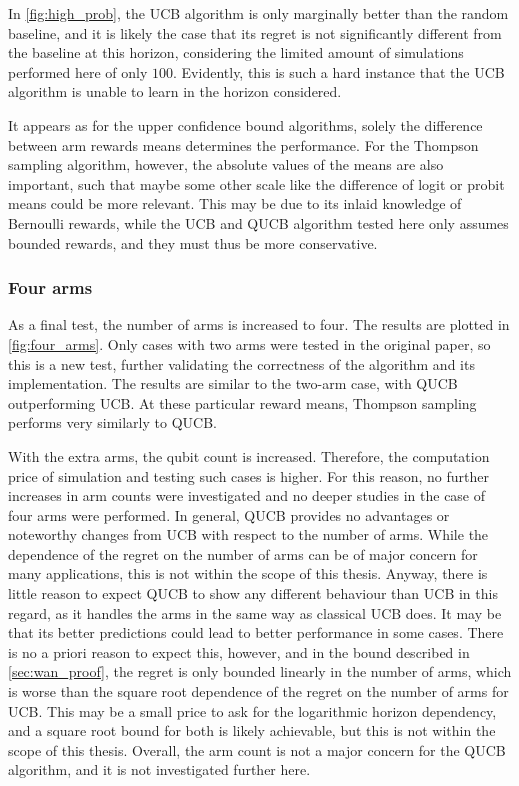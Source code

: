 In \cref{fig:high_prob}, the UCB algorithm is only marginally better than the random baseline, and it is likely the case that its regret is not significantly different from the baseline at this horizon, considering the limited amount of simulations performed here of only $100$.
Evidently, this is such a hard instance that the UCB algorithm is unable to learn in the horizon considered.

It appears as for the upper confidence bound algorithms, solely the difference between arm rewards means determines the performance.
For the Thompson sampling algorithm, however, the absolute values of the means are also important, such that maybe some other scale like the difference of logit or probit means could be more relevant.
This may be due to its inlaid knowledge of Bernoulli rewards, while the UCB and QUCB algorithm tested here only assumes bounded rewards, and they must thus be more conservative.

\clearpage

\subsubsection{Four arms}
As a final test, the number of arms is increased to four.
The results are plotted in \cref{fig:four_arms}.
Only cases with two arms were tested in the original paper, so this is a new test, further validating the correctness of the algorithm and its implementation.
The results are similar to the two-arm case, with QUCB outperforming UCB.
At these particular reward means, Thompson sampling performs very similarly to QUCB.


With the extra arms, the qubit count is increased.
Therefore, the computation price of simulation and testing such cases is higher.
For this reason, no further increases in arm counts were investigated and no deeper studies in the case of four arms were performed.
In general, QUCB provides no advantages or noteworthy changes from UCB with respect to the number of arms.
While the dependence of the regret on the number of arms can be of major concern for many applications, this is not within the scope of this thesis.
Anyway, there is little reason to expect QUCB to show any different behaviour than UCB in this regard, as it handles the arms in the same way as classical UCB does.
It may be that its better predictions could lead to better performance in some cases.
There is no a priori reason to expect this, however, and in the bound described in \cref{sec:wan_proof}, the regret is only bounded linearly in the number of arms, which is worse than the square root dependence of the regret on the number of arms for UCB.
This may be a small price to ask for the logarithmic horizon dependency, and a square root bound for both is likely achievable, but this is not within the scope of this thesis.
Overall, the arm count is not a major concern for the QUCB algorithm, and it is not investigated further here.

